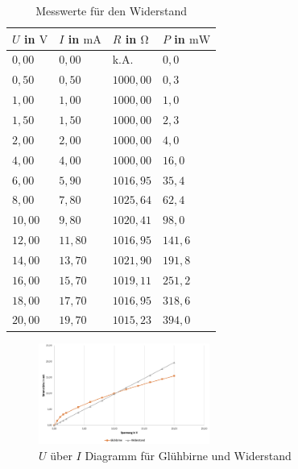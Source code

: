         \begin{table}[H]
            \centering
            \caption{Messwerte für den Widerstand}
            \begin{tabular}{|l|l|l|l|}
                \hline
                $U$ in $\mathrm{V}$ & $I$ in $\mathrm{mA}$ & $R$ in $\mathrm{\Omega}$ & $P$ in $\mathrm{mW}$\\
                \hline\hline
                $0,00$ & $0,00$ & k.A. & $0,0$\\
                \hline
                $0,50$ & $0,50$ & $1000,00$ & $0,3$\\
                \hline
                $1,00$ & $1,00$ & $1000,00$ & $1,0$\\
                \hline
                $1,50$ & $1,50$ & $1000,00$ & $2,3$\\
                \hline
                $2,00$ & $2,00$ & $1000,00$ & $4,0$\\
                \hline
                $4,00$ & $4,00$ & $1000,00$ & $16,0$\\
                \hline
                $6,00$ & $5,90$ & $1016,95$ & $35,4$\\
                \hline
                $8,00$ & $7,80$ & $1025,64$ & $62,4$\\
                \hline
                $10,00$ & $9,80$ & $1020,41$ & $98,0$\\
                \hline
                $12,00$ & $11,80$ & $1016,95$ & $141,6$\\
                \hline
                $14,00$ & $13,70$ & $1021,90$ & $191,8$\\
                \hline
                $16,00$ & $15,70$ & $1019,11$ & $251,2$\\
                \hline
                $18,00$ & $17,70$ & $1016,95$ & $318,6$\\
                \hline
                $20,00$ & $19,70$ & $1015,23$ & $394,0$\\
                \hline
            \end{tabular}
                        \label{tab:widerstand}
        \end{table}

        \begin{figure}[H]
            \centering
            \includegraphics[width=0.5\textwidth]{bilder/Physik_02.png}
            \caption{$U$ über $I$ Diagramm für Glühbirne und Widerstand}
            \label{fig:wertev1}
        \end{figure}

